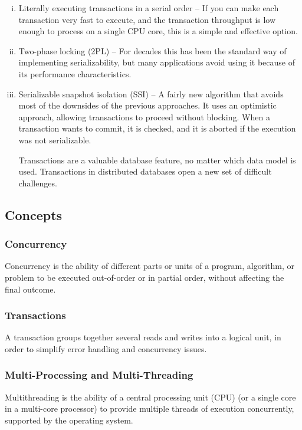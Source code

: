 \documentclass{article}
\begin{document}
    \begin{enumerate}[i.]
        \item Literally executing transactions in a serial order -- If you can make each transaction very fast to execute, and the transaction throughput is low enough to process on a single CPU core, this is a simple and effective option.
        
        \item  Two-phase locking (2PL) --  For decades this has been the standard way of implementing serializability, but  many applications avoid using it because of its performance characteristics.
        
        \item Serializable snapshot isolation (SSI) -- A fairly new algorithm that avoids most of the downsides of the previous approaches. It uses an optimistic approach, allowing transactions to proceed without blocking. When a transaction wants to commit, it is checked, and it is aborted if the execution was not serializable.
        
        Transactions are a valuable database feature, no matter which data model is used. Transactions in distributed databases open a new set of difficult challenges.
    \end{enumerate}
    
    \subsection{Concepts}
    \subsubsection{Concurrency}
    Concurrency is the ability of different parts or units of a program, algorithm, or problem to be executed out-of-order or in partial order, without affecting the final outcome.
    
    \subsubsection{Transactions}
    A transaction groups together several reads and writes into a logical unit, in order to simplify error handling and concurrency issues.
    
    \subsubsection{Multi-Processing and Multi-Threading}
    Multithreading is the ability of a central processing unit (CPU) (or a single core in a multi-core processor) to provide multiple threads of execution concurrently, supported by the operating system.
    
\end{document}
